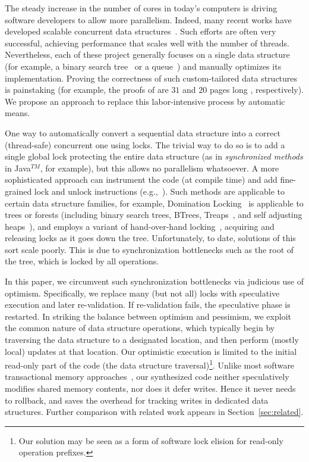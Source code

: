 The steady increase in the number of  cores in today's computers is driving software developers to allow more parallelism.
Indeed, many recent works have developed scalable concurrent data
structures~\cite{ArbelA2014,DrachslerVY2014,NatarajanM2014,BrownER2014,CrainGR2013,BraginskyP2012,
AfekKKMT2012,EllenFRB2010,BronsonCCO2010,HerlihyLLS2007,Michael:1996}.
Such efforts are often very successful, achieving performance that scales well
with the number of threads.
Nevertheless, each of these project generally focuses on a single data structure
(for example, a binary search tree~\cite{ArbelA2014} or a queue~\cite{Michael:1996}) and manually optimizes its implementation.
Proving the correctness of such custom-tailored data structures is painstaking
(for example, the proofs of \cite{BraginskyP2012,EllenFRB2010} are $31$ and $20$ pages long , respectively).
We propose an approach to replace this labor-intensive process by automatic means.

One way to automatically convert a sequential data structure into a correct (thread-safe) concurrent one using locks.
The trivial way to do so is to add a single global lock protecting the entire data structure
(as in \emph{synchronized methods} in Java$^{TM}$, for example), but this allows no parallelism whatsoever.
A more sophisticated approach can instrument the code (at compile time) and add
fine-grained lock and unlock instructions (e.g.,~\cite{Gueta2011,MZGB:POPL06}). Such
methods are applicable to certain data structure families, for example,
Domination Locking~\cite{Gueta2011} is applicable to trees or forests
(including binary search trees, BTrees, Treaps~\cite{AragonS1989}, and self adjusting heaps~\cite{Sleator:SAH1986:SAH}),
and employs a variant of hand-over-hand locking~\cite{SilberschatzK1980},
acquiring and releasing locks as it goes down the tree.
Unfortunately, to date, solutions of this sort scale poorly.
This is due to synchronization bottlenecks such as the root of the tree,
which is locked by all operations.

In this paper, we circumvent such synchronization bottlenecks via judicious use of optimism.
Specifically, we replace many (but not all) locks with speculative execution and later re-validation.
If re-validation fails, the speculative phase is restarted.
In striking the balance between optimism and pessimism, we exploit the common nature of data structure operations,
which typically begin by traversing the data structure to a designated location, and then perform (mostly local) updates at that location.
Our optimistic execution is limited to the initial read-only part of the code (the data structure traversal)\footnote{Our solution may be seen as a form of software lock elision for read-only operation prefixes.}.
Unlike most software transactional memory approaches~\cite{HLR:SLCA2010},
our synthesized code neither speculatively modifies shared memory contents, nor does it defer writes.
Hence it never needs to rollback, and saves the overhead for tracking writes in dedicated data structures.
Further comparison with related work appears in Section~\ref{sec:related}.

